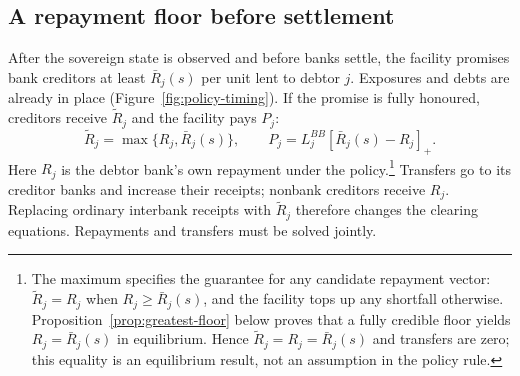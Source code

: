 \begin{table}[htbp]
\centering
{}
\label{tab:ex-post-compensation}


\par\smallskip

\end{table}


\subsection{A repayment floor before settlement}

After the sovereign state is observed and before banks settle, the facility promises bank creditors at least $\bar R_j(s)$ per unit lent to debtor $j$. Exposures and debts are already in place (Figure~\ref{fig:policy-timing}). If the promise is fully honoured, creditors receive $\widetilde R_j$ and the facility pays $P_j$:
\[
 \widetilde R_j=\max\{R_j,\bar R_j(s)\},\qquad
 P_j=L_j^{BB}[\bar R_j(s)-R_j]_+.
\]
Here $R_j$ is the debtor bank's own repayment under the policy.\footnote{The maximum specifies the guarantee for any candidate repayment vector: $\widetilde R_j=R_j$ when $R_j\geq\bar R_j(s)$, and the facility tops up any shortfall otherwise. Proposition~\ref{prop:greatest-floor} below proves that a fully credible floor yields $R_j=\bar R_j(s)$ in equilibrium. Hence $\widetilde R_j=R_j=\bar R_j(s)$ and transfers are zero; this equality is an equilibrium result, not an assumption in the policy rule.} Transfers go to its creditor banks and increase their receipts; nonbank creditors receive $R_j$. Replacing ordinary interbank receipts with $\widetilde R_j$ therefore changes the clearing equations. Repayments and transfers must be solved jointly.

